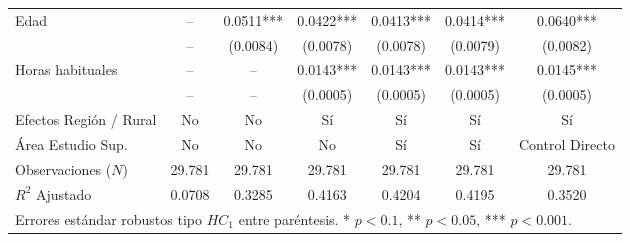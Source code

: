 \documentclass[11pt,a4paper]{article}
\begin{document}
\begin{table}[htbp]
{\begin{tabular}{lcccccc}
Edad & -- & 0.0511*** & 0.0422*** & 0.0413*** & 0.0414*** & 0.0640*** \\
 & -- & (0.0084) & (0.0078) & (0.0078) & (0.0079) & (0.0082) \\
\addlinespace
Horas habituales & -- & -- & 0.0143*** & 0.0143*** & 0.0143*** & 0.0145*** \\
 & -- & -- & (0.0005) & (0.0005) & (0.0005) & (0.0005) \\
\midrule
Efectos Región / Rural & No & No & Sí & Sí & Sí & Sí \\
Área Estudio Sup. & No & No & No & Sí & Sí & Control Directo \\
\midrule
Observaciones ($N$) & 29.781 & 29.781 & 29.781 & 29.781 & 29.781 & 29.781 \\
$R^2$ Ajustado & 0.0708 & 0.3285 & 0.4163 & 0.4204 & 0.4195 & 0.3520 \\
\bottomrule
\multicolumn{7}{l}{\footnotesize Errores estándar robustos tipo $HC_1$ entre paréntesis. * $p < 0.1$, ** $p < 0.05$, *** $p < 0.001$.}
\end{tabular}
}
\end{table}
\end{document}
